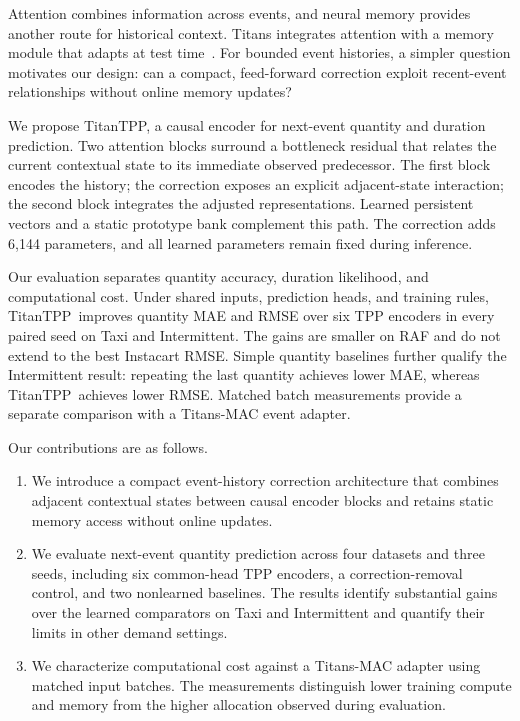 \documentclass[runningheads]{llncs}
\newcommand{\method}{TitanTPP}
\begin{document}
Attention combines information across events, and neural memory provides
another route for historical context. Titans integrates attention with a
memory module that adapts at test time~\cite{behrouz2025titans}. For bounded
event histories, a simpler question motivates our design: can a compact,
feed-forward correction exploit recent-event relationships without online
memory updates?

We propose \method, a causal encoder for next-event quantity and duration
prediction. Two attention blocks surround a bottleneck residual that relates
the current contextual state to its immediate observed predecessor. The first
block encodes the history; the correction exposes an explicit adjacent-state
interaction; the second block integrates the adjusted representations.
Learned persistent vectors and a static prototype bank complement this path.
The correction adds 6,144 parameters, and all learned parameters remain fixed
during inference.

Our evaluation separates quantity accuracy, duration likelihood, and
computational cost. Under shared inputs, prediction heads, and training rules,
\method\ improves quantity MAE and RMSE over six TPP encoders in every paired
seed on Taxi and Intermittent. The gains are smaller on RAF and do not extend
to the best Instacart RMSE. Simple quantity baselines further qualify the
Intermittent result: repeating the last quantity achieves lower MAE, whereas
\method\ achieves lower RMSE. Matched batch measurements provide a separate
comparison with a Titans-MAC event adapter.

Our contributions are as follows.
\begin{enumerate}
\item We introduce a compact event-history correction architecture that
combines adjacent contextual states between causal encoder blocks and retains
static memory access without online updates.
\item We evaluate next-event quantity prediction across four datasets and
three seeds, including six common-head TPP encoders, a correction-removal
control, and two nonlearned baselines. The results identify substantial gains
over the learned comparators on Taxi and Intermittent and quantify their
limits in other demand settings.
\item We characterize computational cost against a Titans-MAC adapter using
matched input batches. The measurements distinguish lower training compute
and memory from the higher allocation observed during evaluation.
\end{enumerate}
\end{document}
